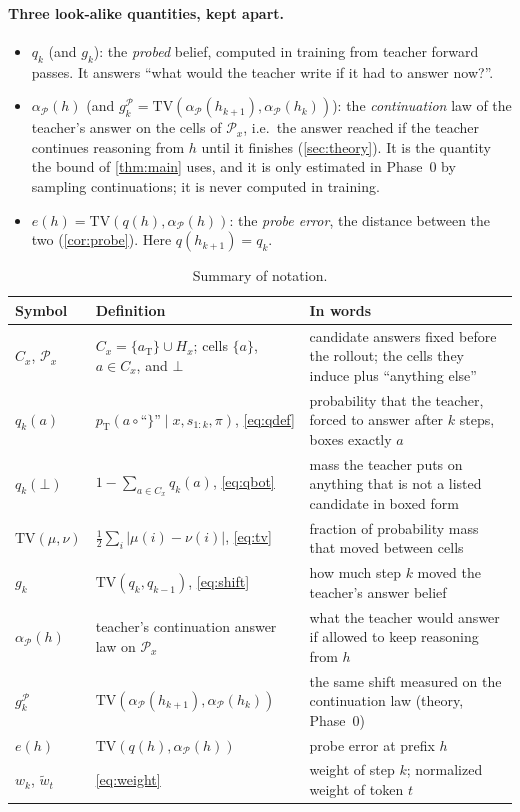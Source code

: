 \documentclass[11pt]{article}
\theoremstyle{definition}
\theoremstyle{remark}
\newcommand{\pT}{p_{\mathrm{T}}}
\newcommand{\aT}{a_{\mathrm{T}}}
\newcommand{\TV}{\mathrm{TV}}
\newcommand{\other}{\bot}
\begin{document}
\paragraph{Three look-alike quantities, kept apart.}
\begin{itemize}[itemsep=1pt]
\item $q_k$ (and $g_k$): the \emph{probed} belief, computed in training from teacher forward passes. It answers ``what would the teacher write if it had to answer now?''.
\item $\alpha_{\mathcal P}(h)$ (and $g^{\mathcal P}_k=\TV(\alpha_{\mathcal P}(h_{k+1}),\alpha_{\mathcal P}(h_k))$): the \emph{continuation} law of the teacher's answer on the cells of $\mathcal P_x$, i.e.\ the answer reached if the teacher continues reasoning from $h$ until it finishes (\cref{sec:theory}). It is the quantity the bound of \cref{thm:main} uses, and it is only estimated in Phase~0 by sampling continuations; it is never computed in training.
\item $e(h)=\TV(q(h),\alpha_{\mathcal P}(h))$: the \emph{probe error}, the distance between the two (\cref{cor:probe}). Here $q(h_{k+1})=q_k$.
\end{itemize}

\begin{table}[h]
\centering
\small
\begin{tabular}{@{}>{\raggedright\arraybackslash}p{2.6cm}>{\raggedright\arraybackslash}p{6.2cm}>{\raggedright\arraybackslash}p{5.2cm}@{}}
\toprule
Symbol & Definition & In words \\
\midrule
$C_x$, $\mathcal P_x$ & $C_x=\{\aT\}\cup H_x$; cells $\{a\}$, $a\in C_x$, and $\other$ & candidate answers fixed before the rollout; the cells they induce plus ``anything else'' \\
$q_k(a)$ & $\pT(a\circ\text{``\}''}\mid x,s_{1:k},\pi)$, \cref{eq:qdef} & probability that the teacher, forced to answer after $k$ steps, boxes exactly $a$ \\
$q_k(\other)$ & $1-\sum_{a\in C_x}q_k(a)$, \cref{eq:qbot} & mass the teacher puts on anything that is not a listed candidate in boxed form \\
$\TV(\mu,\nu)$ & $\tfrac12\sum_i|\mu(i)-\nu(i)|$, \cref{eq:tv} & fraction of probability mass that moved between cells \\
$g_k$ & $\TV(q_k,q_{k-1})$, \cref{eq:shift} & how much step $k$ moved the teacher's answer belief \\
$\alpha_{\mathcal P}(h)$ & teacher's continuation answer law on $\mathcal P_x$ & what the teacher would answer if allowed to keep reasoning from $h$ \\
$g^{\mathcal P}_k$ & $\TV(\alpha_{\mathcal P}(h_{k+1}),\alpha_{\mathcal P}(h_k))$ & the same shift measured on the continuation law (theory, Phase~0) \\
$e(h)$ & $\TV(q(h),\alpha_{\mathcal P}(h))$ & probe error at prefix $h$ \\
$w_k$, $\tilde w_t$ & \cref{eq:weight} & weight of step $k$; normalized weight of token $t$ \\
\bottomrule
\end{tabular}
\caption{Summary of notation.}
\label{tab:notation}
\end{table}
\end{document}
